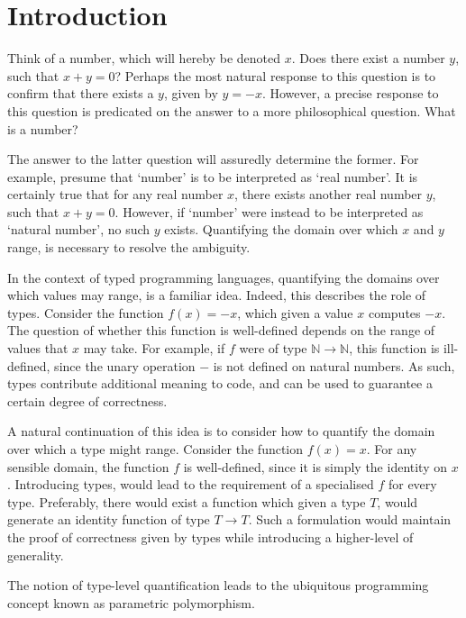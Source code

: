 \documentclass[../Dissertation.tex]{subfiles}
\begin{document}
\section{Introduction}
Think of a number, which will hereby be denoted $x$. Does there exist a number $y$, such that $x + y = 0$? Perhaps the most natural response to this question is to confirm that there exists a $y$, given by $y = -x$. However, a precise response to this question is predicated on the answer to a more philosophical question. What is a number?
\par
The answer to the latter question will assuredly determine the former. For example, presume that `number' is to be interpreted as `real number'. It is certainly true that for any real number $x$, there exists another real number $y$, such that $x + y = 0$. However, if `number' were instead to be interpreted as `natural number', no such $y$ exists. Quantifying the domain over which $x$ and $y$ range, is necessary to resolve the ambiguity.
\par
In the context of typed programming languages, quantifying the domains over which values may range, is a familiar idea. Indeed, this describes the role of types. Consider the function $f(x) = -x$, which given a value $x$ computes $-x$. The question of whether this function is well-defined depends on the range of values that $x$ may take. For example, if $f$ were of type $\mathbb{N} \rightarrow \mathbb{N}$, this function is ill-defined, since the unary operation $-$ is not defined on natural numbers. As such, types contribute additional meaning to code, and can be used to guarantee a certain degree of correctness.
\par
A natural continuation of this idea is to consider how to quantify the domain over which a type might range. Consider the function $f(x) = x$. For any sensible domain, the function $f$ is well-defined, since it is simply the identity on $x$. Introducing types, would lead to the requirement of a specialised $f$ for every type. Preferably, there would exist a function which given a type $T$, would generate an identity function of type $T \rightarrow T$. Such a formulation would maintain the proof of correctness given by types while introducing a higher-level of generality.
\par
The notion of type-level quantification leads to the ubiquitous programming concept known as parametric polymorphism.
\end{document}
